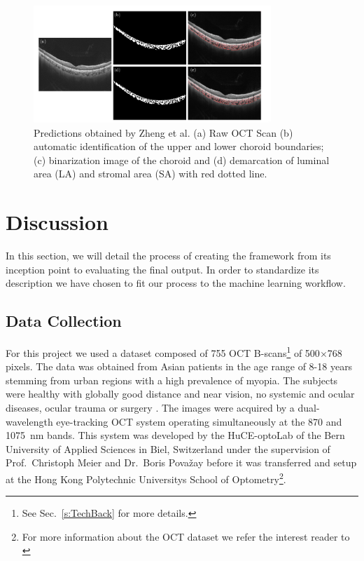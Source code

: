 \documentclass[12pt,a4paper]{scrartcl}
\begin{document}
\begin{figure}[H]
    \centering
    \includegraphics[width=0.8\textwidth]{./images/choroidal-segmentation-zheng.png}
    \caption{Predictions obtained by Zheng et al. (a) Raw OCT Scan (b) automatic identification of the upper and lower choroid boundaries; (c) binarization image of the choroid and (d) demarcation of luminal area (LA) and stromal area (SA) with red dotted line. \cite{Zheng2020}}
\end{figure}





\section{Discussion}\label{s:Discussion}

In this section, we will detail the process of creating the framework from its inception point to evaluating the final output. In order to standardize its description we have chosen to fit our process to the machine learning workflow. 

\subsection{Data Collection}\label{ss:data_collection}
For this project we used a dataset composed of 755 OCT B-scans\footnote{See Sec.~\ref{s:TechBack} for more details.} of 500$\times$768 pixels. The data was obtained from Asian patients in the age range of 8-18 years stemming from urban regions with a high prevalence of myopia. The subjects were healthy with globally good distance and near vision, no systemic and ocular diseases, ocular trauma or surgery \cite{Ronchetti2019}. The images were acquired by a dual-wavelength eye-tracking OCT system operating simultaneously at the 870 and \SI{1075}{\nano\metre} bands. This system was developed by the HuCE-optoLab of the Bern University of Applied Sciences in Biel, Switzerland under the supervision of Prof.~Christoph Meier and Dr.~Boris Pova\v{z}ay\cite{Ronchetti2019}  before it was transferred and setup at the Hong Kong Polytechnic University\textquotesingle s School of Optometry\footnote{For more information about the OCT dataset we refer the interest reader to \cite{Ronchetti2019}}.
\end{document}
